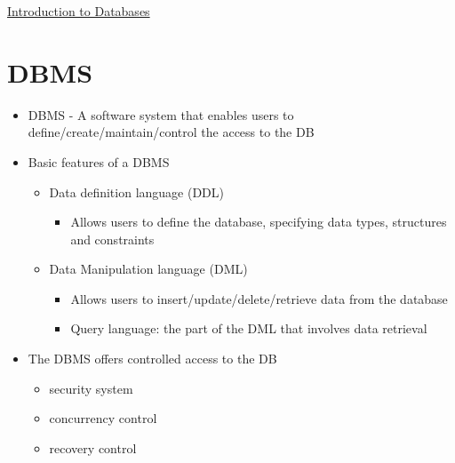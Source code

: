 \documentclass{article}[18pt]
\begin{document}
\begin{center}
\underline{\huge Introduction to Databases}
\end{center}
\section{DBMS}
\begin{itemize}
	\item DBMS - A software system that enables users to define/create/maintain/control the access to the DB
	\item Basic features of a DBMS
	\begin{itemize}
		\item Data definition language (DDL)
		\begin{itemize}
			\item Allows users to define the database, specifying data types, structures and constraints
		\end{itemize}
		\item Data Manipulation language (DML)
		\begin{itemize}
			\item Allows users to insert/update/delete/retrieve data from the database
			\item Query language: the part of the DML that involves data retrieval
		\end{itemize}
	\end{itemize}
	\item The DBMS offers controlled access to the DB
	\begin{itemize}
		\item security system
		\item concurrency control
		\item recovery control
	\end{itemize}
\end{itemize}
\end{document}
